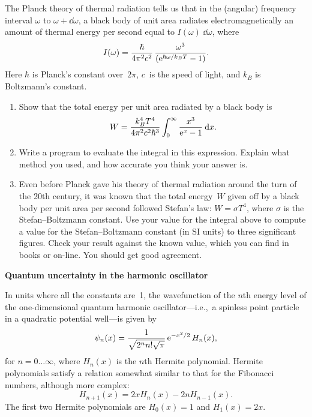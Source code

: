 \documentclass[12pt]{article}
\begin{document}
\begin{exercises}
\exskip The Planck theory of thermal radiation tells us that in the
(angular) frequency interval $\omega$ to $\omega+\dd\omega$, a black body
of unit area radiates electromagnetically an amount of thermal energy per
second equal to $I(\omega)\>\dd\omega$, where
\begin{displaymath}
  I(\omega) = {\hbar\over4\pi^2c^2}\,{\omega^3\over(\mathrm{e}^{\hbar\omega/k_BT}-1)}.
\end{displaymath}
Here $\hbar$ is Planck's constant over~$2\pi$, $c$~is the speed of light,
and $k_B$ is Boltzmann's constant.
\begin{enumerate}\setlength{\itemsep}{0pt}
\item Show that the total energy per unit area radiated by a black body is
\begin{displaymath}
W = {k_B^4 T^4\over4\pi^2c^2\hbar^3} \int_0^\infty {x^3\over\mathrm{e}^x-1}\>\mathrm{d} x.
\end{displaymath}
\item Write a program to evaluate the integral in this expression.  Explain
  what method you used, and how accurate you think your answer is.
\item Even before Planck gave his theory of thermal radiation around the
  turn of the 20th century, it was known that the total energy~$W$ given
  off by a black body per unit area per second followed Stefan's
  law: $W = \sigma T^4$, where $\sigma$ is the Stefan--Boltzmann constant.
  Use your value for the integral above to compute a value for the
  Stefan--Boltzmann constant (in SI units) to three significant figures.
  Check your result against the known value, which you can find in books or
  on-line.  You should get good agreement.
\end{enumerate}



\exercise \textbf{Quantum uncertainty in the harmonic oscillator}

\exskip In units where all the constants are~1, the wavefunction of the
$n$th energy level of the one-dimensional quantum harmonic
oscillator---i.e.,~a spinless point particle in a quadratic potential
well---is given by
\begin{displaymath}
\psi_n(x) = {1\over\sqrt{2^n n!\sqrt{\pi}}}\, \mathrm{e}^{-x^2/2}\,H_n(x),
\end{displaymath}
for $n=0\ldots\infty$, where $H_n(x)$ is the $n$th Hermite
polynomial.  Hermite polynomials satisfy a relation somewhat similar to
that for the Fibonacci numbers, although more complex:
\begin{displaymath}
H_{n+1}(x) = 2xH_n(x) - 2nH_{n-1}(x).
\end{displaymath}
The first two Hermite polynomials are $H_0(x)=1$ and $H_1(x)=2x$.


\end{exercises}
\end{document}
